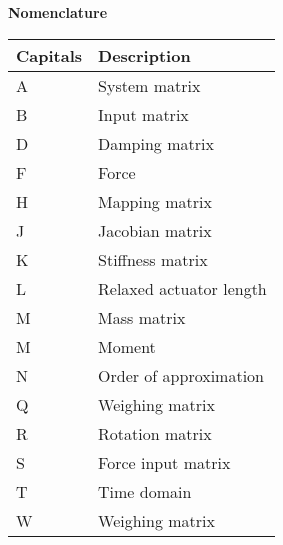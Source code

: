 \begin{spacing}{0.9}

\Large{\textbf{Nomenclature}}

\begin{multicols}{2}
\begin{table}[H]
\centering
    \begin{tabular}{p{1.7cm} p{4.8cm}} \hline
    \textbf{Capitals}    &   \textbf{Description }\\ \hline
    A      &  System matrix \\
    B     &  Input matrix \\
    D     &  Damping matrix \\
    F     & Force \\
    H     &  Mapping matrix \\
    J     &  Jacobian matrix \\
    K     &  Stiffness matrix \\
    L     &  Relaxed actuator length \\
    M     &  Mass matrix \\
    M     &  Moment \\
    N     & Order of approximation \\

    Q     & Weighing matrix \\
    R     & Rotation matrix \\
    S     & Force input matrix \\
    T     & Time domain \\
    W     & Weighing matrix \\ \hline
    \end{tabular}
\end{table}





\end{multicols}
\end{spacing}
